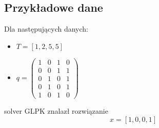 \documentclass[a4paper,11pt]{article}
\theoremstyle{mytheor}
\begin{document}
\subsection{Przykładowe dane}
Dla następujących danych:
\begin{itemize}
    \item $T = [1, 2, 5, 5]$
    \item $q = \left( \begin{matrix} 1 & 0 & 1 & 0 \\ 0 & 0 & 1 & 1 \\ 0 & 1 & 0 & 1 \\ 0 & 1 & 0 & 1 \\ 1 & 0 & 1 & 0 \end{matrix} \right) $
\end{itemize}

solver GLPK znalazł rozwiązanie
$$ x = [1,0,0,1] $$
\end{document}
